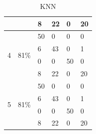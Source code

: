 \documentclass[USenglish]{ifimaster}  %
\begin{document}
\begin{table}[h]
\begin{tabular}{@{}llllll@{}}
			\multicolumn{1}{l|}{} & \multicolumn{1}{l|}{} & \multicolumn{1}{l|}{8} & \multicolumn{1}{l|}{22} & \multicolumn{1}{l|}{0} & 20 \\ \midrule
			\multicolumn{1}{l|}{\multirow{4}{*}{4}} & \multicolumn{1}{l|}{\multirow{4}{*}{81\%}} & \multicolumn{1}{l|}{50} & \multicolumn{1}{l|}{0} & \multicolumn{1}{l|}{0} & 0 \\ \cmidrule(l){3-6} 
			\multicolumn{1}{l|}{} & \multicolumn{1}{l|}{} & \multicolumn{1}{l|}{6} & \multicolumn{1}{l|}{43} & \multicolumn{1}{l|}{0} & 1 \\ \cmidrule(l){3-6} 
			\multicolumn{1}{l|}{} & \multicolumn{1}{l|}{} & \multicolumn{1}{l|}{0} & \multicolumn{1}{l|}{0} & \multicolumn{1}{l|}{50} & 0 \\ \cmidrule(l){3-6} 
			\multicolumn{1}{l|}{} & \multicolumn{1}{l|}{} & \multicolumn{1}{l|}{8} & \multicolumn{1}{l|}{22} & \multicolumn{1}{l|}{0} & 20 \\ \midrule
			\multicolumn{1}{l|}{\multirow{4}{*}{5}} & \multicolumn{1}{l|}{\multirow{4}{*}{81\%}} & \multicolumn{1}{l|}{50} & \multicolumn{1}{l|}{0} & \multicolumn{1}{l|}{0} & 0 \\ \cmidrule(l){3-6} 
			\multicolumn{1}{l|}{} & \multicolumn{1}{l|}{} & \multicolumn{1}{l|}{6} & \multicolumn{1}{l|}{43} & \multicolumn{1}{l|}{0} & 1 \\ \cmidrule(l){3-6} 
			\multicolumn{1}{l|}{} & \multicolumn{1}{l|}{} & \multicolumn{1}{l|}{0} & \multicolumn{1}{l|}{0} & \multicolumn{1}{l|}{50} & 0 \\ \cmidrule(l){3-6} 
			\multicolumn{1}{l|}{} & \multicolumn{1}{l|}{} & \multicolumn{1}{l|}{8} & \multicolumn{1}{l|}{22} & \multicolumn{1}{l|}{0} & 20 \\ \bottomrule
		\end{tabular}
		\caption{KNN }
		\label{knnexp}
	\end{table}
	\FloatBarrier
	
\end{document}
